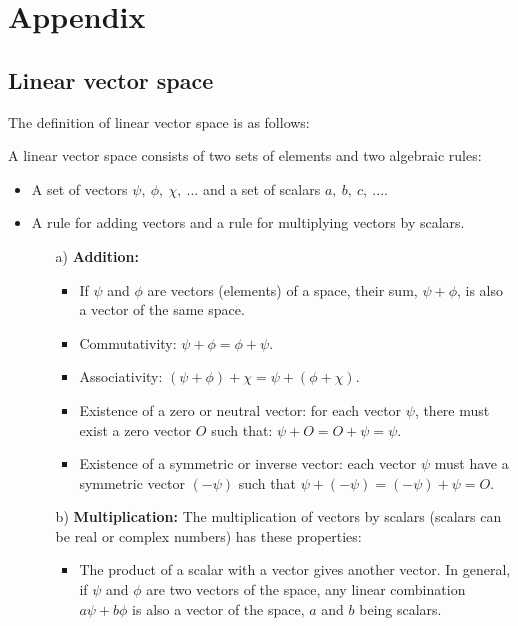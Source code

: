 \section{Appendix}

\subsection{Linear vector space}

The definition of linear vector space is as follows:

\begin{definition} \label{linear_vector_space}
    A linear vector space consists of two sets of elements and two algebraic rules:
    \begin{itemize}
        \item A set of vectors $\psi, \ \phi, \ \chi, \ ...$ and a set of scalars $a, \ b, \ c, \ ...$.
        \item A rule for adding vectors and a rule for multiplying vectors by scalars.
        \begin{enumerate}
            \item[a)] \textbf{Addition:}
            \begin{itemize}
                \item If $\psi$ and $\phi$ are vectors (elements) of a space, their sum, $\psi + \phi$, is also a vector of the same space.
                \item Commutativity: $\psi + \phi = \phi + \psi$.
                \item Associativity: $(\psi + \phi) + \chi = \psi + (\phi + \chi)$.
                \item Existence of a zero or neutral vector: for each vector $\psi$, there must exist a zero vector $O$ such that: $\psi + O = O + \psi = \psi$.
                \item Existence of a symmetric or inverse vector: each vector $\psi$ must have a symmetric vector $(-\psi)$ such that $\psi + (-\psi) = (-\psi) + \psi = O$.
            \end{itemize}
            \item[b)] \textbf{Multiplication:} The multiplication of vectors by scalars (scalars can be real or complex numbers) has these properties:
            \begin{itemize}
                \item The product of a scalar with a vector gives another vector. In general, if $\psi$ and $\phi$ are two vectors of the space, any linear combination $a\psi + b\phi$ is also a vector of the space, $a$ and $b$ being scalars.

\end{itemize}
\end{enumerate}
\end{itemize}
\end{definition}
